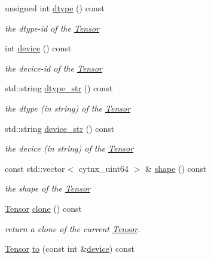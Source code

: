 \begin{DoxyCompactItemize}
\item 
unsigned int \hyperlink{classcytnx_1_1Tensor_a4472af6f8e825a13440e832bf82fb627}{dtype} () const
\begin{DoxyCompactList}\small\item\em the dtype-\/id of the \hyperlink{classcytnx_1_1Tensor}{Tensor} \end{DoxyCompactList}\item 
int \hyperlink{classcytnx_1_1Tensor_ac6d3310eb4defbdacf662dcd81d8fe09}{device} () const
\begin{DoxyCompactList}\small\item\em the device-\/id of the \hyperlink{classcytnx_1_1Tensor}{Tensor} \end{DoxyCompactList}\item 
std\+::string \hyperlink{classcytnx_1_1Tensor_a9e09106c7529e8be90caa52e1541e498}{dtype\+\_\+str} () const
\begin{DoxyCompactList}\small\item\em the dtype (in string) of the \hyperlink{classcytnx_1_1Tensor}{Tensor} \end{DoxyCompactList}\item 
std\+::string \hyperlink{classcytnx_1_1Tensor_a335f7625fa01784f49b2223238d0c14e}{device\+\_\+str} () const
\begin{DoxyCompactList}\small\item\em the device (in string) of the \hyperlink{classcytnx_1_1Tensor}{Tensor} \end{DoxyCompactList}\item 
const std\+::vector$<$ cytnx\+\_\+uint64 $>$ \& \hyperlink{classcytnx_1_1Tensor_a6d0ab6d09633ad4d6099aa822ec5335a}{shape} () const
\begin{DoxyCompactList}\small\item\em the shape of the \hyperlink{classcytnx_1_1Tensor}{Tensor} \end{DoxyCompactList}\item 
\hyperlink{classcytnx_1_1Tensor}{Tensor} \hyperlink{classcytnx_1_1Tensor_a5e2248e9babdb786167ed349df9084ae}{clone} () const
\begin{DoxyCompactList}\small\item\em return a clone of the current \hyperlink{classcytnx_1_1Tensor}{Tensor}. \end{DoxyCompactList}\item 
\hyperlink{classcytnx_1_1Tensor}{Tensor} \hyperlink{classcytnx_1_1Tensor_acf7f697a9434f9bc98a7d00a555ee982}{to} (const int \&\hyperlink{classcytnx_1_1Tensor_ac6d3310eb4defbdacf662dcd81d8fe09}{device}) const

\end{DoxyCompactItemize}

